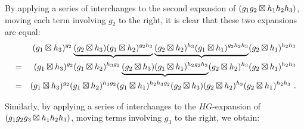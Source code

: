 By applying a series of interchanges to the second expansion of
$(g_1g_2 \boxtimes h_1h_2h_{3})$, 
moving each term involving  $g_2$  to the right, 
it is clear that these two expansions are equal:
\begin{eqnarray*}
 &   & (g_1 \boxtimes h_{3})^{g_2}   \underbrace{(g_2 \boxtimes h_{3})  
       (g_1 \boxtimes h_2)^{g_2h_{3}}}   \underbrace{(g_2 \boxtimes h_2)^{h_{3}} 
        (g_1 \boxtimes h_1)^{g_2h_2h_{3}}} 
         (g_2 \boxtimes h_1)^{h_2h_{3}} \\
 & = & (g_1 \boxtimes h_{3})^{g_2}   (g_1 \boxtimes h_2)^{h_{3}g_2} 
       \underbrace{(g_2 \boxtimes h_{3})    (g_1 \boxtimes h_1)^{h_2g_2h_{3}}} 
        (g_2 \boxtimes h_2)^{h_{3}}   (g_2 \boxtimes h_1)^{h_2h_{3}} \\
 & = & (g_1 \boxtimes h_{3})^{g_2}    (g_1 \boxtimes h_2)^{h_{3}g_2}  
       (g_1 \boxtimes h_1)^{h_2h_{3}g_2}   (g_2 \boxtimes h_{3}) 
        (g_2 \boxtimes h_2)^{h_{3}}   (g_2 \boxtimes h_1)^{h_2h_{3}}~.
\end{eqnarray*}


Similarly, by applying a series of interchanges to
the  $HG$-expansion of  $(g_1g_2g_{3}\boxtimes h_1h_2h_{3})$,
moving terms involving  $g_3$  to the right, 
we obtain: 

